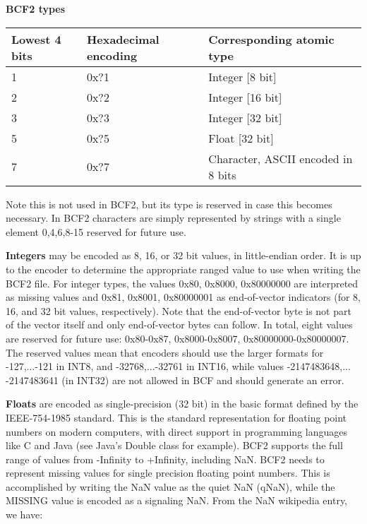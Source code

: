 \documentclass[8pt]{article}
\begin{document}
\textbf{BCF2 types}

\vspace{0.3cm}
\begin{tabular}{|l | l | l|} \hline
Lowest 4 bits & Hexadecimal encoding & Corresponding atomic type \\ \hline
1 & 0x?1 & Integer [8 bit] \\ \hline
2 & 0x?2 & Integer [16 bit] \\ \hline
3 & 0x?3 & Integer [32 bit] \\ \hline
5 & 0x?5 & Float [32 bit] \\ \hline
7 & 0x?7 & Character, ASCII encoded in 8 bits \\ \hline
\end{tabular}
\vspace{0.3cm}

Note this is not used in BCF2, but its type is reserved in case this becomes necessary.  In BCF2 characters are simply represented by strings with a single element 0,4,6,8-15 reserved for future use.

\vspace{0.3cm}

\textbf{Integers} may be encoded as 8, 16, or 32 bit values, in little-endian
order.  It is up to the encoder to determine the appropriate ranged value to
use when writing the BCF2 file. 
For integer types, the values 0x80, 0x8000, 0x80000000 are interpreted as
missing values and 0x81, 0x8001, 0x80000001 as end-of-vector indicators
(for 8, 16, and 32 bit values, respectively). Note that the end-of-vector byte
is not part of the vector itself and only end-of-vector bytes can follow.
In total, eight values are reserved for future use: 0x80-0x87, 0x8000-0x8007, 0x80000000-0x80000007.
The reserved values mean that encoders should use the larger formats for -127,...-121 in INT8, and -32768,...-32761 in INT16, while values -2147483648,...
-2147483641 (in INT32) are not allowed in BCF and should generate an error.

\vspace{0.3cm}
\textbf{Floats} are encoded as single-precision (32 bit) in the basic format
defined by the IEEE-754-1985 standard.  This is the standard representation for
floating point numbers on modern computers, with direct support in programming
languages like C and Java (see Java's Double class for example).  BCF2 supports
the full range of values from -Infinity to +Infinity, including NaN.  BCF2
needs to represent missing values for single precision floating point numbers.
This is accomplished by writing the NaN value as the quiet NaN (qNaN), while
the MISSING value is encoded as a signaling NaN.  From the NaN wikipedia entry,
we have:
\end{document}
